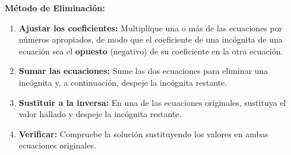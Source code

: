 \begin{theorem}
\textbf{Método de Eliminación:}

\begin{enumerate}
    \item \textbf{Ajustar los coeficientes:} Multiplique una o más de las ecuaciones por números apropiados, de modo que el coeficiente de una incógnita de una ecuación sea el \textbf{opuesto} (negativo) de su coeficiente en la otra ecuación.

    \item \textbf{Sumar las ecuaciones:} Sume las dos ecuaciones para eliminar una incógnita y, a continuación, despeje la incógnita restante.

    \item \textbf{Sustituir a la inversa:} En una de las ecuaciones originales, sustituya el valor hallado y despeje la incógnita restante.

    \item \textbf{Verificar:} Compruebe la solución sustituyendo los valores en ambas ecuaciones originales.
\end{enumerate}
\end{theorem}

